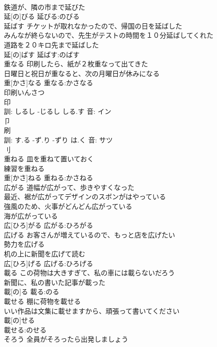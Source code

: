 \documentclass[8pt]{extreport}
\begin{document}
\begin{CJK}{UTF8}{min}
\\	鉄道が、隣の市まで延びた 
\\	延[の]びる			延びる:のびる
\\	延ばす	チケットが取れなかったので、帰国の日を延ばした 
\\	みんなが終らないので、先生がテストの時間を１０分延ばしてくれた 
\\	道路を２０キロ先まで延ばした 
\\	延[の]ばす			延ばす:のばす
\\	重なる	印刷したら、紙が２枚重なって出てきた 
\\	日曜日と祝日が重なると、次の月曜日が休みになる 
\\	重[かさ]なる			重なる:かさなる
\\	印刷いんさつ
\\	印 
\\	訓: しるし -じるし しる.す 音: イン 
\\	卩 
\\	刷 
\\	訓: す.る -ず.り -ずり は.く 音: サツ 
\\	刂 
\\	重ねる	皿を重ねて置いておく 
\\	練習を重ねる 
\\	重[かさ]ねる			重ねる:かさねる
\\	広がる	道幅が広がって、歩きやすくなった 
\\	最近、裾が広がってデザインのスボンがはやっている 
\\	強風のため、火事がどんどん広がっている 
\\	海が広がっている 
\\	広[ひろ]がる			広がる:ひろがる
\\	広げる	お客さんが増えているので、もっと店を広げたい 
\\	勢力を広げる 
\\	机の上に新聞を広げて読む 
\\	広[ひろ]げる			広げる:ひろげる
\\	載る	この荷物は大きすぎて、私の車には載らないだろう 
\\	新聞に、私の書いた記事が載った 
\\	載[の]る			載る:のる
\\	載せる	棚に荷物を載せる 
\\	いい作品は文集に載せますから、頑張って書いてください 
\\	載[の]せる		
\\	載せる:のせる
\\	そろう	全員がそろったら出発しましょう 

\end{CJK}
\end{document}
